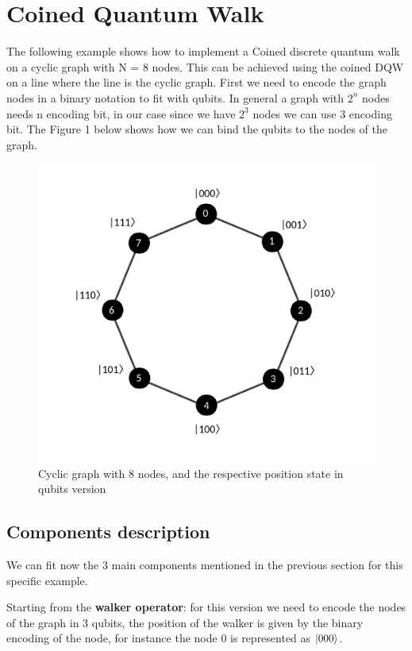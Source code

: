 \section{Coined Quantum Walk}

The following example shows how to implement a Coined discrete quantum walk on a cyclic graph with N = 8 nodes. This can be achieved using the coined DQW on a line
where the line is the cyclic graph. First we need to encode the graph nodes in a binary notation to fit with qubits. In general a graph with $2^{n}$ nodes needs n encoding 
bit, in our case since we have $2^{3}$ nodes we can use 3 encoding bit. The Figure 1 below shows how we can bind the qubits to the nodes of the graph.

\begin{figure}[h!]
    \includegraphics[scale=0.3]{img/cyclic_graph.png}
    \caption{Cyclic graph with 8 nodes, and the respective position state in qubits version}
    \centering
\end{figure}

\subsection{Components description}

We can fit now the 3 main components mentioned in the previous section for this specific example. 

Starting from the \textbf{walker operator}: for this version we need to encode the nodes of the graph in 3 qubits, the position of the walker 
is given by the binary encoding of the node, for instance the node 0 is represented as $\ket{000}$.

